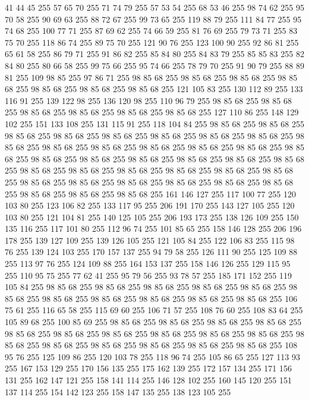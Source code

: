 41 44 45 255 57 65 70 255 71 74 79 255 57 53 54 255 68 53 46 255 98 74 62 255 95 70 58 255 90 69 63 255 88 72 67 255 99 73 65 255 119 88 79 255 111 84 77 255 95 74 68 255 100 77 71 255 87 69 62 255 74 66 59 255 81 76 69 255 79 73 71 255 83 75 70 255 118 86 74 255 89 75 70 255 121 90 76 255 123 100 90 255 92 86 81 255 65 61 58 255 86 79 71 255 91 86 82 255 85 84 80 255 84 83 79 255 85 85 83 255 82 84 80 255 80 66 58 255 99 75 66 255 95 74 66 255 78 79 70 255 91 90 79 255 88 89 81 255 109 98 85 255 97 86 71 255 98 85 68 255 98 85 68 255 98 85 68 255 98 85 68 255 98 85 68 255 98 85 68 255 98 85 68 255 121 105 83 255 130 112 89 255 133 116 91 255 139 122 98 255 136 120 98 255 110 96 79 255 98 85 68 255 98 85 68 255 98 85 68 255 98 85 68 255 98 85 68 255 98 85 68 255 127 110 86 255 148 129 102 255 151 133 108 255 131 115 91 255 118 104 84 255 98 85 68 255
98 85 68 255 98 85 68 255 98 85 68 255 98 85 68 255 98 85 68 255 98 85 68 255 98 85 68 255 98 85 68 255 98 85 68 255 98 85 68 255 98 85 68 255 98 85 68 255 98 85 68 255 98 85 68 255 98 85 68 255 98 85 68 255 98 85 68 255 98 85 68 255 98 85 68 255 98 85 68 255 98 85 68 255 98 85 68 255 98 85 68 255 98 85 68 255 98 85 68 255 98 85 68 255 98 85 68 255 98 85 68 255 98 85 68 255 98 85 68 255 98 85 68 255 98 85 68 255 98 85 68 255 98 85 68 255 98 85 68 255 161 146 127 255 117 100 77 255 120 103 80 255 123 106 82 255 133 117 95 255 206 191 170 255 143 127 105 255 120 103 80 255 121 104 81 255 140 125 105 255 206 193 173 255 138 126 109 255 150 135 116 255 117 101 80 255 112 96 74 255 101 85 65 255 158 146 128 255 206 196 178 255 139 127 109 255 139 126 105 255 121 105 84 255 122 106 83 255 115 98 76 255 139 124 103 255 170 157 137 255 94 79 58 255 126 111 90 255 125 109 88 255 113 97 76 255
124 109 88 255 164 153 137 255 158 146 126 255 129 115 95 255 110 95 75 255 77 62 41 255 95 79 56 255 93 78 57 255 185 171 152 255 119 105 84 255 98 85 68 255 98 85 68 255 98 85 68 255 98 85 68 255 98 85 68 255 98 85 68 255 98 85 68 255 98 85 68 255 98 85 68 255 98 85 68 255 98 85 68 255 106 75 61 255 116 65 58 255 115 69 60 255 106 71 57 255 108 76 60 255 108 83 64 255 105 89 68 255 100 85 69 255 98 85 68 255 98 85 68 255 98 85 68 255 98 85 68 255 98 85 68 255 98 85 68 255 98 85 68 255 98 85 68 255 98 85 68 255 98 85 68 255 98 85 68 255 98 85 68 255 98 85 68 255 98 85 68 255 98 85 68 255 98 85 68 255 108 95 76 255 125 109 86 255 120 103 78 255 118 96 74 255 105 86 65 255 127 113 93 255 167 153 129 255 170 156 135 255 175 162 139 255 172 157 134 255 171 156 131 255 162 147 121 255 158 141 114 255 146 128 102 255 160 145 120 255 151 137 114 255 154 142 123 255 158 147 135 255 138 123 105 255

